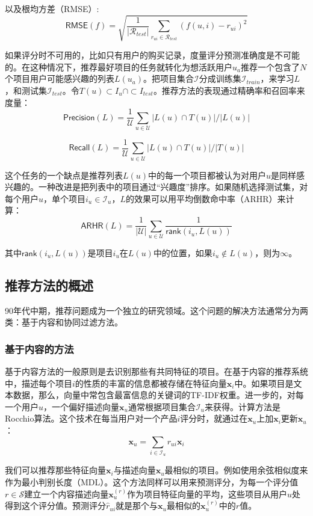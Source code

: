 \documentclass{article}
\begin{document}
 以及根均方差（RMSE）:
 $$ \mathsf{RMSE}(f)=\sqrt{\frac{1}{|\mathcal{R}_{test}|}\mathop{\sum}\limits_{r_{ui}\in\mathcal{R}_{test}}(f(u,i)-r_{ui})^2} $$

 如果评分时不可用的，比如只有用户的购买记录，度量评分预测准确度是不可能的。在这种情况下，推荐最好项目的任务就转化为想活跃用户$u_a$推荐一个包含了$N$个项目用户可能感兴趣的列表$L(u_a)$。把项目集合$\mathcal{I}$分成训练集$\mathcal{I}_{train}$，来学习$L$，和测试集$\mathcal{I}_{test}$。令$T(u)\subset{I}_u\cap\subset{I}_{test}$。推荐方法的表现通过精确率和召回率来度量：
 $$ \mathsf{Precision}(L)=\frac{1}{\mathcal{U}}\mathop{\sum}\limits_{u\in\mathcal{U}}|L(u)\cap T(u)|/|L(u)| $$

 $$ \mathsf{Recall}(L)=\frac{1}{\mathcal{U}}\mathop{\sum}\limits_{u\in\mathcal{U}}|L(u)\cap T(u)|/|T(u)| $$

 这个任务的一个缺点是推荐列表$L(u)$中的每一个项目都被认为对用户$u$是同样感兴趣的。一种改进是把列表中的项目通过“兴趣度”排序。如果随机选择测试集，对每个用户$u$，单个项目$i_u\in\mathcal{I}_u$，$L$的效果可以用平均倒数命中率（ARHR）来计算：
 $$ \mathsf{ARHR}(L)=\frac{1}{|\mathcal{U}|}\mathop{\sum}_{u\in\mathcal{U}}\frac{1}{\mathsf{rank}(i_u,L(u))} $$

 其中$\mathsf{rank}(i_u,L(u))$是项目$i_u$在$L(u)$中的位置，如果$i_u\notin L(u)$，则为$\infty$。

 \subsection{推荐方法的概述}
 90年代中期，推荐问题成为一个独立的研究领域。这个问题的解决方法通常分为两类：基于内容和协同过滤方法。

 \subsubsection{基于内容的方法}
 基于内容方法的一般原则是去识别那些有共同特征的项目。在基于内容的推荐系统中，描述每个项目$i$的性质的丰富的信息都被存储在特征向量$\mathbf{x}_i$中。如果项目是文本数据，那么，向量中常包含最富信息的关键词的TF-IDF权重。进一步的，对每一个用户$u$，一个偏好描述向量$\mathbf{x}_u$通常根据项目集合$\mathcal{I}_u$来获得。计算方法是Rocchio算法。这个技术在每当用户对一个产品$i$评分时，就通过在$\mathbf{x}_u$上加$\mathbf{x}_i$更新$\mathbf{x}_u$：
 $$ \mathbf{x}_u=\mathop{\sum}\limits_{i\in\mathcal{I}_u}r_{ui}\mathbf{x}_i $$

 我们可以推荐那些特征向量$\mathbf{x}_i$与描述向量$\mathbf{x}_u$最相似的项目。例如使用余弦相似度来作为最小判别长度（MDL）。这个方法同样可以用来预测评分，为每一个评分值$r\in\mathcal{S}$建立一个内容描述向量$\mathbf{x}_u^{(r)}$作为项目特征向量的平均，这些项目从用户$u$处得到这个评分值。预测评分$\hat{r}_{ui}$就是那个与$\mathbf{x}_u$最相似的$\mathbf{x}_u^{(r)}$中的$r$值。
\end{document}
